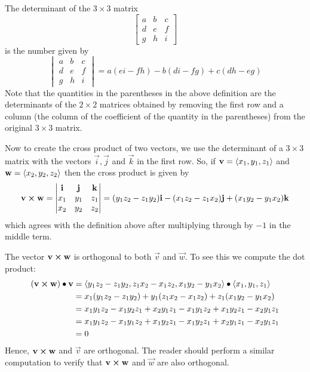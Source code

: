 \documentclass[handout]{ximera}
\begin{document}
\begin{definition}
The determinant of the $3 \times 3$ matrix 
\[
\begin{bmatrix}
a & b & c\\
d & e & f\\
g & h & i
\end{bmatrix}
\]
is the number given by
\[
\begin{vmatrix}
a & b & c\\
d & e & f\\
g & h & i
\end{vmatrix}
= a(ei-fh) - b(di-fg) + c(dh-eg)
\]
Note that the quantities in the parentheses in the above definition are the determinants of the $2 \times 2$ matrices
obtained by removing the first row and a column (the column of the coefficient of the quantity in the parentheses) from the original $3 \times 3$ matrix.
\end{definition}
 Now to create the cross product of two vectors, we use the determinant of a $3 \times 3$ matrix with the vectors $\vec{i}, \vec{j}$ and $\vec{k}$ in the first row.
 So, if $\mathbf{v} = \left\langle x_1, y_1, z_1\right\rangle$ and $\mathbf{w} = \left\langle x_2, y_2, z_2\right\rangle$ then the cross product is given by
 \[
\mathbf{v} \boldsymbol\times \mathbf{w} = 
 \begin{vmatrix}
\mathbf{i} & \mathbf{j} & \mathbf{k}\\
x_1 & y_1 & z_1\\
x_2 & y_2 & z_2
\end{vmatrix} = (y_1z_2 - z_1y_2)\mathbf{i} - (x_1z_2 - z_1x_2)\mathbf{j} + (x_1y_2-y_1x_2)\mathbf{k}
\]
which agrees with the definition above after multiplying through by $-1$ in the middle term.

The vector $\mathbf{v}\boldsymbol\times \mathbf{w}$ is orthogonal to both $\vec{v}$ and $\vec{w}$. To see this we compute the dot product:
\begin{align*}
\left(\mathbf{v} \boldsymbol\times \mathbf{w} \right) \bullet \mathbf{v} &= \left\langle y_1z_2 - z_1y_2, z_1x_2 - x_1z_2, x_1y_2 - y_1x_2\right\rangle \bullet \left\langle x_1, y_1, z_1\right\rangle\\
                                                &= x_1(y_1z_2 - z_1y_2) + y_1(z_1x_2 - x_1z_2) + z_1(x_1y_2 - y_1x_2)\\
                                                &= x_1y_1z_2 - x_1y_2z_1 + x_2y_1z_1 - x_1y_1z_2 + x_1y_2z_1 - x_2y_1z_1\\
                                                &= x_1y_1z_2 - x_1y_1z_2 + x_1y_2z_1 - x_1y_2z_1 + x_2y_1z_1 - x_2y_1z_1\\
                                                &= 0
\end{align*}
Hence, $\mathbf{v} \boldsymbol\times \mathbf{w}$ and $\vec{v}$ are orthogonal.  The reader should perform a similar computation to verify that
$\mathbf{v} \boldsymbol\times \mathbf{w}$ and $\vec{w}$ are also orthogonal.\\
\end{document}
